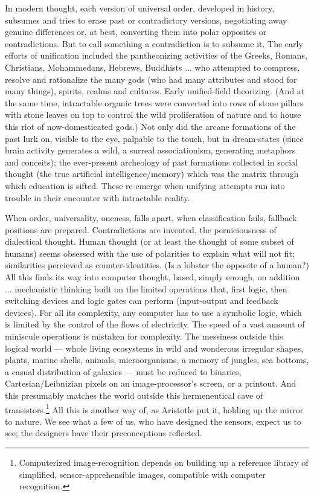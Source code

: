 In modern thought, each version of universal order, developed in history, subsumes and tries to erase past or contradictory versions, negotiating away genuine differences or, at best, converting them into polar opposites or contradictions. But to call something a contradiction is to subsume it. The early efforts of unification included the pantheonizing activities of the Greeks, Romans, Christians, Mohammedans, Hebrews, Buddhists ... who attempted to compress, resolve and rationalize the many gods (who had many attributes and stood for many things), spirits, realms and cultures. Early unified-field theorizing. (And at the same time, intractable organic trees were converted into rows of stone pillars with stone leaves on top to control the wild proliferation of nature and to house this riot of now-domesticated gods.) Not only did the arcane formations of the past lurk on, visible to the eye, palpable to the touch, but in dream-states (since brain activity generates a wild, a surreal associationism, generating metaphors and conceits); the ever-present archeology of past formations collected in social thought (the true artificial intelligence/memory) which was the matrix through which education is sifted. These re-emerge when unifying attempts run into trouble in their encounter with intractable reality.

When order, universality, oneness, falls apart, when classification fails, fallback positions are prepared. Contradictions are invented, the perniciousness of dialectical thought. Human thought (or at least the thought of some subset of humans) seems obsessed with the use of polarities to explain what will not fit; similarities percieved as counter-identities. (Is a lobster the opposite of a human?) All this finds its way into computer thought, based, simply enough, on addition ... mechanistic thinking built on the limited operations that, first logic, then switching devices and logic gates can perform (input-output and feedback devices). For all its complexity, any computer has to use a symbolic logic, which is limited by the control of the flows of electricity. The speed of a vast amount of miniscule operations is mistaken for complexity. The messiness outside this logical world --- whole living ecosystems in wild and wonderous irregular shapes, plants, marine shells, animals, microorganisms, a memory of jungles, sea bottoms, a casual distribution of galaxies --- must be reduced to binaries, Cartesian\slash Leibnizian pixels on an image-processor's screen, or a printout. And this presumably matches the world outside this hermeneutical cave of transistors.\footnote{Computerized image-recognition depends on building up a reference library of simplified, sensor-apprehensible images, compatible with computer recognition.} All this is another way of, as Aristotle put it, holding up the mirror to nature. We see what a few of us, who have designed the sensors, expect us to see; the designers have their preconceptions reflected.

